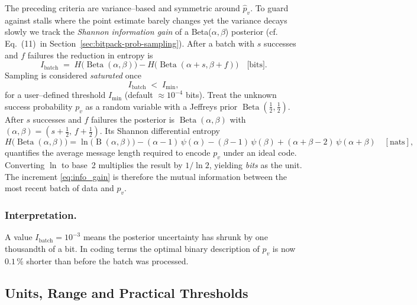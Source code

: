 The preceding criteria are variance--based and symmetric around
$\widehat{p}_v$.  To guard against stalls where the point estimate barely
changes yet the variance decays slowly we track the \emph{Shannon information
gain} of a Beta($\alpha,\beta$) posterior (cf.
Eq.~(11)~in Section~\ref{sec:bitpack-prob-sampling}).  After a batch with
$s$ successes and $f$ failures the reduction in entropy is
\begin{equation}
  I_{\text{batch}}
  \;=\;
  H\bigl(\operatorname{Beta}(\alpha,\beta)\bigr)
  - H\bigl(\operatorname{Beta}(\alpha+s,\beta+f)\bigr)
  \quad\text{[bits]}.
  \label{eq:info_gain}
\end{equation}
Sampling is considered \emph{saturated} once
\begin{equation}
  I_{\text{batch}} \;<\; I_{\min},
  \label{eq:info_stop}
\end{equation}
for a user--defined threshold $I_{\min}$ (default $\approx 10^{-4}$ bits). Treat the unknown success probability $p_v$ as a random variable with a
Jeffreys prior $\operatorname{Beta}(\tfrac12,\tfrac12)$.  After $s$ successes
and $f$ failures the posterior is $\operatorname{Beta}(\alpha,\beta)$ with
$(\alpha,\beta)=(s+\tfrac12,\,f+\tfrac12)$.  Its Shannon differential
entropy
\begin{equation}
  H\bigl(\operatorname{Beta}(\alpha,\beta)\bigr)
  = \ln\!\bigl(\operatorname{B}(\alpha,\beta)\bigr)
    - (\alpha-1)\,\psi(\alpha)
    - (\beta-1)\,\psi(\beta)
    + (\alpha+\beta-2)\,\psi(\alpha+\beta)
  \quad[\text{nats}],
\end{equation}
quantifies the average message length required to encode $p_v$ under an
ideal code.  Converting $\ln$ to base~2 multiplies the result by
$1/\ln 2$, yielding \emph{bits} as the unit.  The increment
\eqref{eq:info_gain} is therefore the mutual information between the most
recent batch of data and $p_v$.

\subsubsection*{Interpretation.}  A value $I_{\text{batch}}=10^{-3}$ means the
posterior uncertainty has shrunk by one thousandth of a bit.  In coding
terms the optimal binary description of $p_v$ is now $0.1\,\%$ shorter
than before the batch was processed.

\subsection{Units, Range and Practical Thresholds}
\label{subsubsec:info_units}

